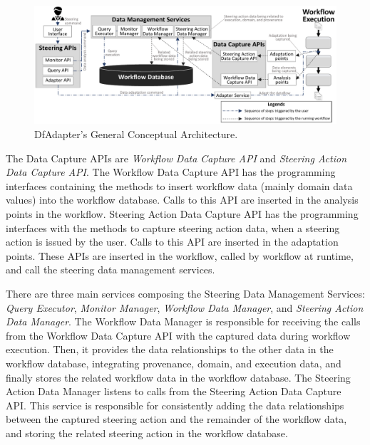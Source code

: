 \begin{figure}[H]
    \centering
    \includegraphics[width=\textwidth,keepaspectratio]{img/chap5_gen_arch.pdf}
    \caption{DfAdapter's General Conceptual Architecture.}
    \label{fig:general_arch}
\end{figure}



The Data Capture APIs are \textit{Workflow Data Capture API} and \textit{Steering Action Data Capture API}.
The Workflow Data Capture API has the programming interfaces containing the methods to insert workflow data (mainly domain data values) into the workflow database. Calls to this API are inserted in the analysis points in the workflow.
Steering Action Data Capture API has the programming interfaces with the methods to capture steering action data, when a steering action is issued by the user. Calls to this API are inserted in the adaptation points.
These APIs are inserted in the workflow, called by workflow at runtime, and call the steering data management services.


There are three main services composing the Steering Data Management Services: \textit{Query Executor}, \textit{Monitor Manager}, \textit{Workflow Data Manager}, and \textit{Steering Action Data Manager}.
The Workflow Data Manager is responsible for receiving the calls from the Workflow Data Capture API with the captured data during workflow execution.
Then, it provides the data relationships to the other data in the workflow database, integrating provenance, domain, and execution data, and finally stores the related workflow data in the workflow database.
The Steering Action Data Manager listens to calls from the Steering Action Data Capture API.
This service is responsible for
consistently adding the data relationships between the captured steering action and the remainder of the workflow data, and storing the related steering action in the workflow database.

